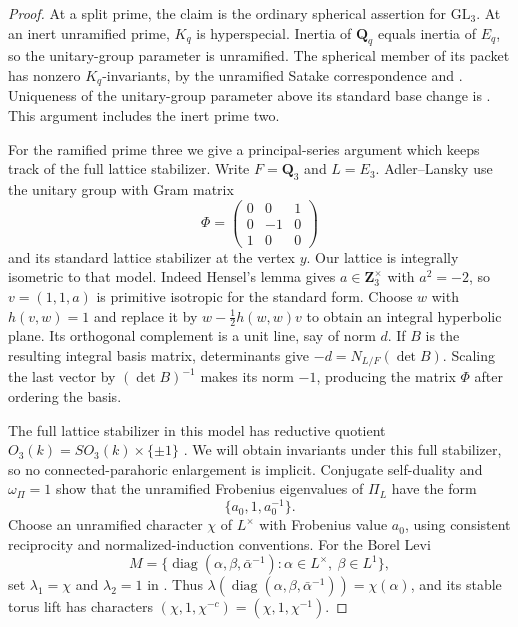 \documentclass[11pt,a4paper]{article}
\theoremstyle{definition}
\begin{document}
\begin{proof}
At a split prime, the claim is the ordinary spherical assertion for
$\mathrm{GL}_3$. At an inert unramified prime, $K_q$ is hyperspecial.
Inertia of $\mathbf Q_q$ equals inertia of $E_q$, so the unitary-group
parameter is unramified. The spherical member of its packet has nonzero
$K_q$-invariants, by the unramified Satake correspondence and
\cite[Proposition~1.5.2(5), p.~79]{K17KMSW2014}.
Uniqueness of the unitary-group parameter above its standard base change
is \cite[Lemma~1.2.5]{K17KMSW2014}. This argument includes the inert
prime two.

For the ramified prime three we give a principal-series argument which
keeps track of the full lattice stabilizer. Write $F=\mathbf Q_3$ and
$L=E_3$. Adler--Lansky \cite[\S4.1, pp.~10--11]{K17AdlerLansky2010}
use the unitary group with Gram matrix
\[
 \Phi=\begin{pmatrix}0&0&1\\0&-1&0\\1&0&0\end{pmatrix}
\]
and its standard lattice stabilizer at the vertex $y$. Our lattice is
integrally isometric to that model. Indeed Hensel's lemma gives
$a\in\mathbf Z_3^\times$ with $a^2=-2$, so $v=(1,1,a)$ is primitive
isotropic for the standard form. Choose $w$ with $h(v,w)=1$ and replace it
by $w-\tfrac12h(w,w)v$ to obtain an integral hyperbolic plane. Its
orthogonal complement is a unit line, say of norm $d$. If $B$ is the
resulting integral basis matrix, determinants give
$-d=N_{L/F}(\det B)$. Scaling the last vector by $(\det B)^{-1}$ makes
its norm $-1$, producing the matrix $\Phi$ after ordering the basis.

The full lattice stabilizer in this model has reductive quotient
$O_3(k)=SO_3(k)\times\{\pm1\}$
\cite[\S4.2.1, pp.~11--12]{K17AdlerLansky2010}. We will obtain invariants
under this full stabilizer, so no connected-parahoric enlargement is
implicit. Conjugate self-duality and $\omega_\Pi=1$ show that the
unramified Frobenius eigenvalues of $\Pi_L$ have the form
\[
 \{a_0,1,a_0^{-1}\}.
\]
Choose an unramified character $\chi$ of $L^\times$ with Frobenius value
$a_0$, using consistent reciprocity and normalized-induction conventions.
For the Borel Levi
\[
 M=\{\operatorname{diag}(\alpha,\beta,\bar\alpha^{-1}):
       \alpha\in L^\times,\ \beta\in L^1\},
\]
set $\lambda_1=\chi$ and $\lambda_2=1$ in
\cite[(4.4.1), p.~14]{K17AdlerLansky2010}. Thus
$\lambda(\operatorname{diag}(\alpha,\beta,\bar\alpha^{-1}))=
\chi(\alpha)$, and its stable torus lift has characters
$(\chi,1,\chi^{-c})=(\chi,1,\chi^{-1})$.


\end{proof}
\end{document}
